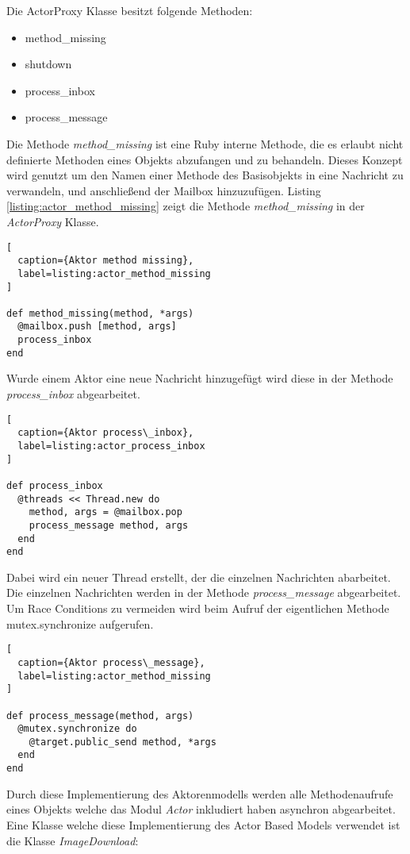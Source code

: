 Die ActorProxy Klasse besitzt folgende Methoden:

\begin{itemize}
  \item method\_missing
  \item shutdown
  \item process\_inbox
  \item process\_message
\end{itemize}

Die Methode \emph{method\_missing} ist eine Ruby interne Methode, die es erlaubt nicht definierte Methoden eines Objekts abzufangen und zu behandeln. Dieses Konzept wird genutzt um den Namen einer Methode des Basisobjekts in eine Nachricht zu verwandeln, und anschließend der Mailbox hinzuzufügen. Listing \ref{listing:actor_method_missing} zeigt die Methode \emph{method\_missing} in der \emph{ActorProxy} Klasse. 

\begin{lstlisting}[
  caption={Aktor method missing},
  label=listing:actor_method_missing
]

def method_missing(method, *args)
  @mailbox.push [method, args]
  process_inbox
end
\end{lstlisting}

Wurde einem Aktor eine neue Nachricht hinzugefügt wird diese in der Methode \emph{process\_inbox} abgearbeitet. 

\begin{lstlisting}[
  caption={Aktor process\_inbox},
  label=listing:actor_process_inbox
]

def process_inbox
  @threads << Thread.new do
    method, args = @mailbox.pop
    process_message method, args
  end
end
\end{lstlisting}  

Dabei wird ein neuer Thread erstellt, der die einzelnen Nachrichten abarbeitet. Die einzelnen Nachrichten werden in der Methode \emph{process\_message} abgearbeitet. Um Race Conditions zu vermeiden wird beim Aufruf der eigentlichen Methode mutex.synchronize aufgerufen. 


\begin{lstlisting}[
  caption={Aktor process\_message},
  label=listing:actor_method_missing
]

def process_message(method, args)
  @mutex.synchronize do
    @target.public_send method, *args
  end
end
\end{lstlisting}  

Durch diese Implementierung des Aktorenmodells werden alle Methodenaufrufe eines Objekts welche das Modul \emph{Actor} inkludiert haben asynchron abgearbeitet. Eine Klasse welche diese Implementierung des Actor Based Models verwendet ist die Klasse \emph{ImageDownload}:


